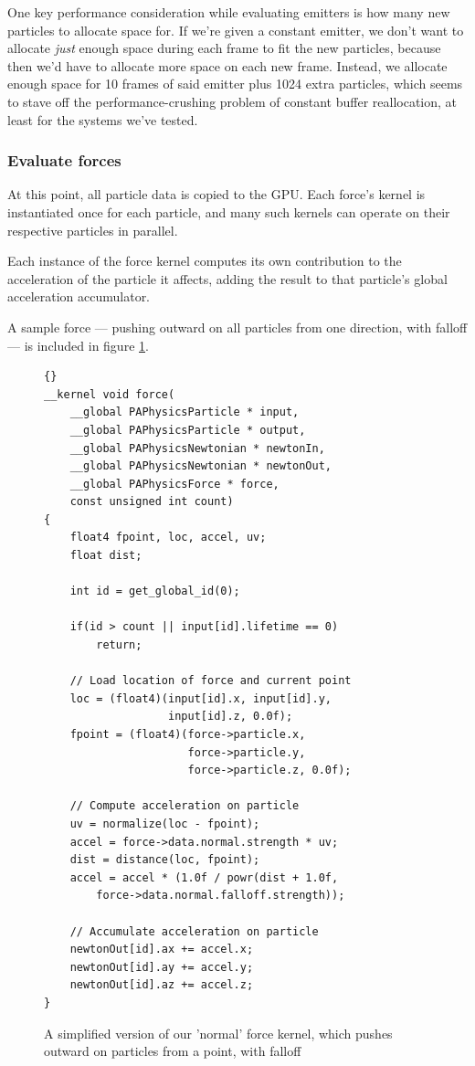 \documentclass{acmsiggraph}
\begin{document}
One key performance consideration while evaluating emitters is how many new particles to allocate space for. If we're given a constant emitter, we don't want to allocate {\it just} enough space during each frame to fit the new particles, because then we'd have to allocate more space on each new frame. Instead, we allocate enough space for 10 frames of said emitter plus 1024 extra particles, which seems to stave off the performance-crushing problem of constant buffer reallocation, at least for the systems we've tested.

\subsubsection{Evaluate forces}

At this point, all particle data is copied to the GPU. Each force's kernel is instantiated once for each particle, and many such kernels can operate on their respective particles in parallel.

Each instance of the force kernel computes its own contribution to the acceleration of the particle it affects, adding the result to that particle's global acceleration accumulator.

A sample force --- pushing outward on all particles from one direction, with falloff --- is included in figure \ref{forceCode}.

\begin{figure}

    \lstset{language=C}
    \lstset{basicstyle=\footnotesize\ttfamily}
    \lstset{numbers=left, numberstyle=\tiny, stepnumber=1, numbersep=5pt}
    \begin{lstlisting}[frame=trbl]{}
__kernel void force(
    __global PAPhysicsParticle * input,
    __global PAPhysicsParticle * output,
    __global PAPhysicsNewtonian * newtonIn,
    __global PAPhysicsNewtonian * newtonOut,
    __global PAPhysicsForce * force,
    const unsigned int count)
{
    float4 fpoint, loc, accel, uv;
    float dist;

    int id = get_global_id(0);

    if(id > count || input[id].lifetime == 0)
        return;

    // Load location of force and current point
    loc = (float4)(input[id].x, input[id].y,
                   input[id].z, 0.0f);
    fpoint = (float4)(force->particle.x,
                      force->particle.y,
                      force->particle.z, 0.0f);

    // Compute acceleration on particle
    uv = normalize(loc - fpoint);
    accel = force->data.normal.strength * uv;
    dist = distance(loc, fpoint);
    accel = accel * (1.0f / powr(dist + 1.0f,
        force->data.normal.falloff.strength));

    // Accumulate acceleration on particle
    newtonOut[id].ax += accel.x;
    newtonOut[id].ay += accel.y;
    newtonOut[id].az += accel.z;
}
    \end{lstlisting}

    \caption{A simplified version of our 'normal' force kernel, which pushes outward on particles from a point, with falloff}
    \label{forceCode}
\end{figure}
\end{document}

